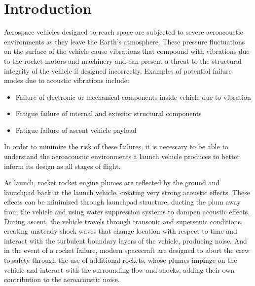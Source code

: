 \documentclass[]{aiaa-tc}%
\begin{document}





\section{Introduction} %

Aerospace vehicles designed to reach space are subjected to severe aeroacoustic environments as they leave the Earth's atmosphere.  These pressure fluctuations on the surface of the vehicle cause vibrations that compound with vibrations due to the rocket motors and machinery and can present a threat to the structural integrity of the vehicle if designed incorrectly.  Examples of potential failure modes due to acoustic vibrations include\cite{AcousticPropulsionLoads}:

\begin{itemize}
  \item Failure of electronic or mechanical components inside vehicle due to vibration
  \item Fatigue failure of internal and exterior structural components
  \item Fatigue failure of ascent vehicle payload
\end{itemize}

In order to minimize the risk of these failures, it is necessary to be able to understand the aeroacoustic environments a launch vehicle produces to better inform its design as all stages of flight.

At launch, rocket rocket engine plumes are reflected by the ground and launchpad back at the launch vehicle, creating very strong acoustic effects.  These effects can be minimized through launchpad structure, ducting the plum away from the vehicle and using water suppression systems to dampen acoustic effects.\cite{MicrophonePhasedArray}  During ascent, the vehicle travels through transonic and supersonic conditions, creating unsteady shock waves that change location with respect to time and interact with the turbulent boundary layers of the vehicle, producing noise.  And in the event of a rocket failure, modern spacecraft are designed to abort the crew to safety through the use of additional rockets, whose plumes impinge on the vehicle and interact with the surrounding flow and shocks, adding their own contribution to the aeroacoustic noise.
\end{document}

